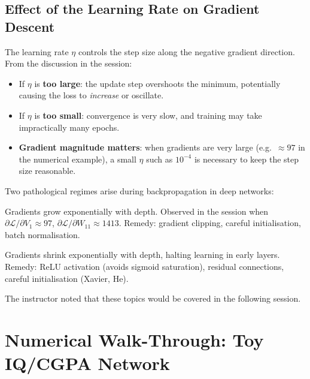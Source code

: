 \documentclass[12pt,a4paper]{article}
\begin{document}
\subsection{Effect of the Learning Rate on Gradient Descent}

The learning rate $\eta$ controls the step size along the negative gradient
direction.  From the discussion in the session:

\begin{itemize}[noitemsep]
  \item If $\eta$ is \textbf{too large}: the update step overshoots the
        minimum, potentially causing the loss to \emph{increase} or oscillate.
  \item If $\eta$ is \textbf{too small}: convergence is very slow, and
        training may take impractically many epochs.
  \item \textbf{Gradient magnitude matters}: when gradients are very large
        (e.g.\ $\approx 97$ in the numerical example), a small $\eta$ such as
        $10^{-4}$ is necessary to keep the step size reasonable.
\end{itemize}

\begin{warningbox}[title=Exploding and Vanishing Gradients]
Two pathological regimes arise during backpropagation in deep networks:
\begin{description}[noitemsep]
  \item[Exploding gradients:] Gradients grow exponentially with depth.
        Observed in the session when $\partial\mathcal{L}/\partial V_1 \approx 97$,
        $\partial\mathcal{L}/\partial W_{11} \approx 1413$.
        Remedy: gradient clipping, careful initialisation, batch normalisation.
  \item[Vanishing gradients:] Gradients shrink exponentially with depth,
        halting learning in early layers.
        Remedy: ReLU activation (avoids sigmoid saturation), residual connections,
        careful initialisation (Xavier, He).
\end{description}
The instructor noted that these topics would be covered in the following session.
\end{warningbox}

\section{Numerical Walk-Through: Toy IQ/CGPA Network}
\label{sec:numerical}
\end{document}
